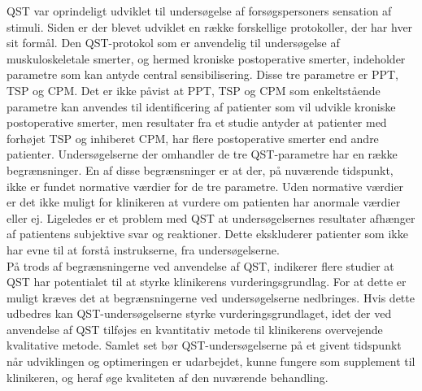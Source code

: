 QST var oprindeligt udviklet til undersøgelse af forsøgspersoners sensation af stimuli. Siden er der blevet udviklet en række forskellige protokoller, der har hver sit formål. Den QST-protokol som er anvendelig til undersøgelse af muskuloskeletale smerter, og hermed kroniske postoperative smerter, indeholder parametre som kan antyde central sensibilisering. Disse tre parametre er PPT, TSP og CPM. Det er ikke påvist at PPT, TSP og CPM som enkeltstående parametre kan anvendes til identificering af patienter som vil udvikle kroniske postoperative smerter, men resultater fra et studie antyder at patienter med forhøjet TSP og inhiberet CPM, har flere postoperative smerter end andre patienter. Undersøgelserne der omhandler de tre QST-parametre har en række begrænsninger. En af disse begrænsninger er at der, på nuværende tidspunkt, ikke er fundet normative værdier for de tre parametre. Uden normative værdier er det ikke muligt for klinikeren at vurdere om patienten har anormale værdier eller ej. Ligeledes er et problem med QST at undersøgelsernes resultater afhænger af patientens subjektive svar og reaktioner. Dette ekskluderer patienter som ikke har evne til at forstå instrukserne, fra undersøgelserne. \\
På trods af begrænsningerne ved anvendelse af QST, indikerer flere studier at QST har potentialet til at styrke klinikerens vurderingsgrundlag. For at dette er muligt kræves det at begrænsningerne ved undersøgelserne nedbringes. Hvis dette udbedres kan QST-undersøgelserne styrke vurderingsgrundlaget, idet der ved anvendelse af QST tilføjes en kvantitativ metode til klinikerens overvejende kvalitative metode. Samlet set bør QST-undersøgelserne på et givent tidspunkt når udviklingen og optimeringen er udarbejdet, kunne fungere som supplement til klinikeren, og heraf øge kvaliteten af den nuværende behandling.



